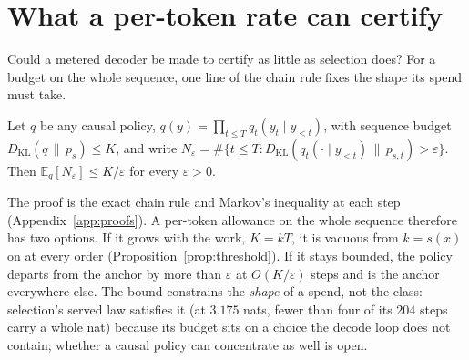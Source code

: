 
\section{What a per-token rate can certify}\label{sec:frontier}

Could a metered decoder be made to certify as little as selection does? For a budget on the whole
sequence, one line of the chain rule fixes the shape its spend must take.

\begin{proposition}\label{prop:sparse}
Let $q$ be any causal policy, $q(y) = \prod_{t \le T} q_t(y_t \mid y_{<t})$, with sequence budget
$D_{\mathrm{KL}}(q \,\|\, p_s) \le K$, and write
$N_\varepsilon = \#\{t \le T : D_{\mathrm{KL}}(q_t(\cdot \mid y_{<t}) \,\|\, p_{s,t}) > \varepsilon\}$.
Then $\mathbb{E}_q[N_\varepsilon] \le K/\varepsilon$ for every $\varepsilon > 0$.
\end{proposition}

The proof is the exact chain rule and Markov's inequality at each step (Appendix~\ref{app:proofs}). A
per-token allowance on the whole sequence therefore has two options. If it grows with the work, $K = kT$, it is vacuous from
$k = s(x)$ on at every order (Proposition~\ref{prop:threshold}). If it stays bounded, the policy departs
from the anchor by more than $\varepsilon$ at $O(K/\varepsilon)$ steps and is the anchor everywhere
else. The bound constrains the \emph{shape} of a spend, not the class: selection's served law satisfies it
(at $3.175$ nats, fewer than four of its $204$ steps carry a whole nat) because its budget sits on a choice
the decode loop does not contain; whether a causal policy can concentrate as well is open.

